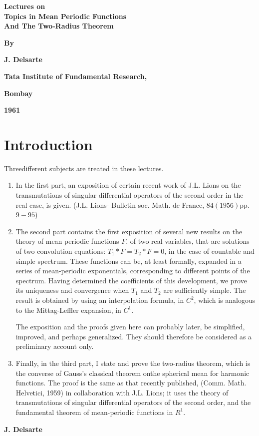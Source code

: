 \thispagestyle{empty}

\begin{center}
{\Large\bf Lectures on}\\[5pt]
{\Large\bf Topics in Mean Periodic Functions}\\[5pt]
{\Large\bf And The Two-Radius Theorem}
\vskip 1cm

{\bf  By}
\medskip

{\large\bf J. Delsarte}
\vfill

{\bf  Tata Institute of Fundamental Research,}

{\bf  Bombay}

{\bf  1961}
\end{center}

\eject


\chapter{Introduction}


Three\pageoriginale different subjects are treated in these lectures.
\begin{enumerate}[1.]
\item In the first part, an exposition of certain recent work of
  J.L. Lions on the transmutations of singular differential operators
  of the second order in the real case, is given. (J.L. Lions-
  Bulletin soc. Math. de France, $84(1956)$pp. $9-95$) 
\item The second part contains the first exposition of several new
  results on the theory of mean periodic functions $F$, of two real
  variables, that are solutions of two convolution equations: $T_1 * F
  = T_2 * F = 0$, in the case of countable and simple spectrum. These
  functions can be, at least formally, expanded in a series of
  mean-periodic exponentials, corresponding to different points of the
  spectrum. Having determined the coefficients of this development, we
  prove its uniqueness and convergence when $T_1$ and $T_2$ are
  sufficiently simple. The result is obtained by using an
  interpolation formula, in $C^2$, which is analogous to the
  Mittag-Leffler expansion, in $C^1$. 

  The exposition and the proofs given here can probably later, be
  simplified, improved, and perhaps generalized. They should therefore
  be considered as a preliminary account only. 
\item Finally, in the third part, I state and prove the two-radius
  theorem, which is the converse of Gauss's classical theorem on\pageoriginale the
  spherical mean for harmonic functions. The proof is the same as that
  recently published, (Comm. Math. Helvetici, 1959) in collaboration
  with J.L. Lions; it uses the theory of transmutations of singular
  differential operators of the second order, and the fundamental
  theorem of mean-periodic functions in $R^1$. 
\end{enumerate}
\vskip 1cm

\hfill{\large\bf J. Delsarte}
